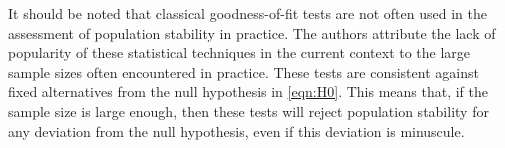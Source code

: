 \documentclass{article}
\theoremstyle{def}
\begin{document}






It should be noted that classical goodness-of-fit tests are not often used in the assessment of population stability in practice. The authors attribute the lack of popularity of these statistical techniques in the current context to the large sample sizes often encountered in practice. These tests are consistent against fixed alternatives from the null hypothesis in \eqref{eqn:H0}. This means that, if the sample size is large enough, then these tests will reject population stability for any deviation from the null hypothesis, even if this deviation is minuscule.
\end{document}
